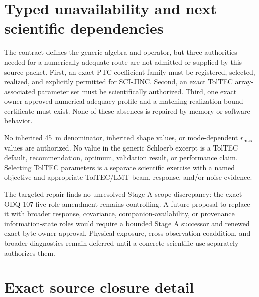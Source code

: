 \documentclass[11pt]{article}
\begin{document}
\section{Typed unavailability and next scientific dependencies}
\label{sec:typed-unavailability}

The contract defines the generic algebra and operator, but three authorities
needed for a numerically adequate route are not admitted or supplied by this
source packet.  First, an exact
PTC coefficient family must be registered, selected, realized, and explicitly
permitted for SCI-JINC.  Second, an exact TolTEC array-associated parameter set
must be scientifically authorized.  Third, one exact owner-approved
numerical-adequacy profile and a matching realization-bound certificate must
exist.  None of these absences is repaired by memory or software behavior.

No inherited 45~m denominator, inherited shape values, or mode-dependent
$r_{\max}$ values are authorized.  No value in the generic Schloerb excerpt is
a TolTEC default, recommendation, optimum, validation result, or performance
claim.  Selecting TolTEC parameters is a separate scientific exercise with a
named objective and appropriate TolTEC/LMT beam, response, and/or noise
evidence.

The targeted repair finds no unresolved Stage A scope discrepancy: the exact
ODQ-107 five-role amendment remains controlling.  A future proposal to replace
it with broader response, covariance, companion-availability, or provenance
information-state roles would require a bounded Stage A successor and renewed
exact-byte owner approval.  Physical exposure, cross-observation coaddition,
and broader diagnostics remain deferred until a concrete scientific use
separately authorizes them.

\clearpage
\appendix

\section{Exact source closure detail}
\label{app:source-closure}
\end{document}
